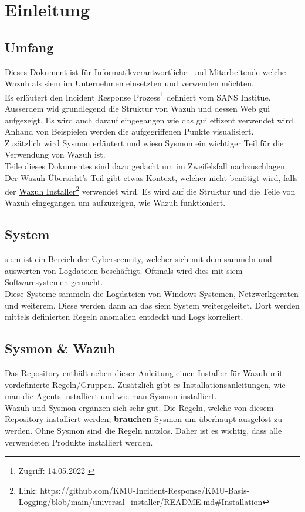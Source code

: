 \chapter{Einleitung}

\section{Umfang}
Dieses Dokument ist für Informatikverantwortliche- und Mitarbeitende welche Wazuh als \acrshort{siem} im Unternehmen einsetzten und verwenden möchten.\\

Es erläutert den Incident Response Prozess\footnote{Zugriff: 14.05.2022 \cite{sans-incident-handler-handbook}} definiert vom SANS Institue. 
Ausserdem wid grundlegend die Struktur von Wazuh und dessen Web \acrshort{gui} aufgezeigt.
Es wird auch darauf eingegangen wie das \acrshort{gui} effizent verwendet wird.
Anhand von Beispielen werden die aufgegriffenen Punkte visualisiert.\\

Zusätzlich wird Sysmon erläutert und wieso Sysmon ein wichtiger Teil für die Verwendung von Wazuh ist.\\

Teile dieses Dokumentes sind dazu gedacht um im Zweifelsfall nachzuschlagen.
Der Wazuh Übersicht's Teil gibt etwas Kontext, welcher nicht benötigt wird, falls der \href{https://github.com/KMU-Incident-Response/KMU-Basis-Logging/blob/main/universal\_installer/README.md\#Installation}{Wazuh Installer}\footnote{Link: https://github.com/KMU-Incident-Response/KMU-Basis-Logging/blob/main/universal\_installer/README.md\#Installation} verwendet wird.
Es wird auf die Struktur und die Teile von Wazuh eingegangen um aufzuzeigen, wie Wazuh funktioniert.  


\section{ System}
\acrfull{siem} ist ein Bereich der Cybersecurity, welcher sich mit dem sammeln und auswerten von Logdateien beschäftigt.
Oftmals wird dies mit \acrshort{siem} Softwaresystemen gemacht.\\

Diese Systeme sammeln die Logdateien von Windows Systemen, Netzwerkgeräten und weiterem.
Diese werden dann an das \acrshort{siem} System weitergeleitet.
Dort werden mittels definierten Regeln anomalien entdeckt und Logs korreliert.

\section{Sysmon \& Wazuh}
Das Repository enthält neben dieser Anleitung einen Installer für Wazuh mit vordefinierte Regeln/Gruppen.
Zusätzlich gibt es Installationsanleitungen, wie man die Agents installiert und wie man Sysmon installiert.\\

Wazuh und Sysmon ergänzen sich sehr gut.
Die Regeln, welche von diesem Repository installiert werden, \textbf{brauchen} Sysmon um überhaupt ausgelöst zu werden.
Ohne Sysmon sind die Regeln nutzlos. 
Daher ist es wichtig, dass alle verwendeten Produkte installiert werden.